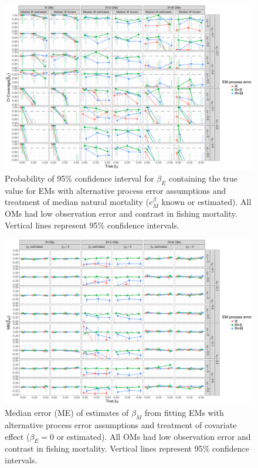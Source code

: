 \documentclass[
  12pt,
]{article}
\begin{document}
\begin{landscape}
\begin{figure}
\begin{center}
\includegraphics[height = \textheight]{beta_E_CI_coverage_main}
\end{center}
\caption{Probability of 95\% confidence interval for $\beta_E$ containing the true value for EMs with alternative process error assumptions and treatment of median natural mortality ($e^\beta_M$ known or estimated). All OMs had low observation error and contrast in fishing mortality. Vertical lines represent 95\% confidence intervals.}\label{beta_E_CI_coverage}
\end{figure}
\end{landscape}

\begin{landscape}
\begin{figure}
\begin{center}
\includegraphics[height = \textheight]{beta_M_bias_main}
\end{center}
\caption{Median error (ME) of estimates of $\beta_M$ from fitting EMs with alternative process error assumptions and treatment of covariate effect ($\beta_E = 0$ or estimated). All OMs had low observation error and contrast in fishing mortality. Vertical lines represent 95\% confidence intervals.}\label{beta_M_bias}
\end{figure}
\end{landscape}
\end{document}
